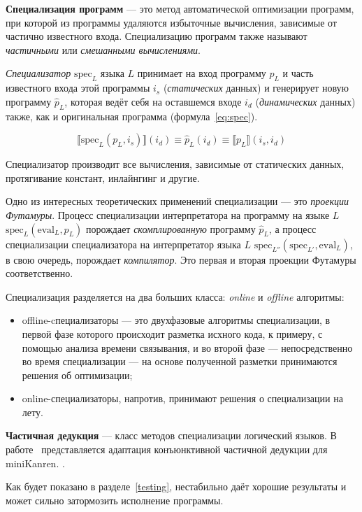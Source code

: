 {\bf Специализация программ} --- это метод автоматической оптимизации программ,
при которой из программы удаляются избыточные вычисления, зависимые от частично известного входа.
Специализацию программ также называют \emph{частичными} или \emph{смешанными вычислениями}\cite{jones}.

{\it Специализатор} $\text{spec}_L$ языка $L$ принимает на вход программу $p_L$ и часть известного входа этой
программы $i_s$ (\emph{статических} данных) и генерирует новую программу $\hat{p}_L$, которая ведёт себя на оставшемся
входе $i_d$ (\emph{динамических} данных) также, как и оригинальная программа (формула~\ref{eq:spec}).

\begin{equation}
  \llbracket \text{spec}_L(p_L, i_s) \rrbracket (i_d) \equiv \hat{p}_L (i_d) \equiv \llbracket p_L \rrbracket (i_s, i_d)
\label{eq:spec}
\end{equation}

Специализатор производит все вычисления, зависимые от статических данных,
протягивание констант, инлайнгинг и другие.


Одно из интересных теоретических применений специализации --- это \emph{проекции Футамуры}\cite{futamura}.
Процесс специализации интерпретатора на программу на языке $L$ $\text{spec}_L(\text{eval}_L, p_L)$
порождает \emph{скомплированную} программу $\hat{p}_L$, а процесс специализации специализатора
на интерпретатор языка $L$ $\text{spec}_{L''}(\text{spec}_{L'}, \text{eval}_L)$, в свою очередь,
порождает \emph{компилятор}. Это первая и вторая проекции Футамуры соответственно.


Специализация разделяется на два больших класса: \emph{online} и \emph{offline} алгоритмы:
\begin{itemize}
\item offline-cпециализаторы --- это двухфазовые алгоритмы специализации, в первой фазе
которого происходит разметка исхного кода, к примеру, с помощью анализа времени связывания,
и во второй фазе --- непосредственно во время специализации --- на основе полученной
разметки принимаются решения об оптимизации;
\item online-специализаторы, напротив, принимают решения о специализации на лету.
\end{itemize}


{\bf Частичная дедукция} --- класс методов специализации логический языков\cite{advanced}.
В работе~\cite{lozov} представляется адаптация конъюнктивной частичной дедукции для miniKanren.
.

Как будет показано в разделе~\ref{testing}, \cpd нестабильно даёт хорошие результаты и
может сильно затормозить исполнение программы.
